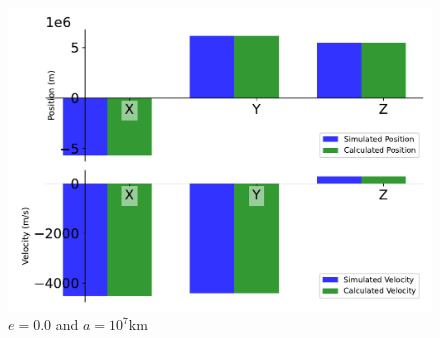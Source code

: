 \begin{figure}[htbp]\centerline{\includegraphics[height=0.7\textwidth, keepaspectratio]{AutoTeX/IncCirc_1}}\caption{$e = 0.0$ and $a = 10^7$km}\label{fig:IncCirc_1}\end{figure}